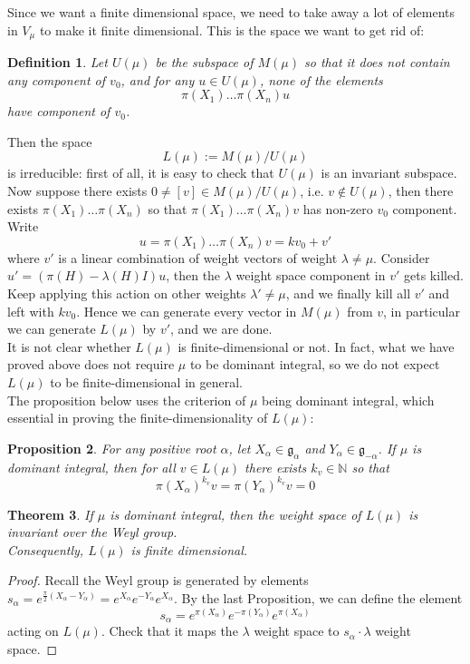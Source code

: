 \documentclass[11pt]{book}
\newtheorem{theorem}{Theorem}[section]
\newtheorem{proposition}[theorem]{Proposition}
\newtheorem{definition}[theorem]{Definition}
\newcommand{\bb}[1]{\mathbb{#1}}
\newcommand{\mf}[1]{\mathfrak{#1}}
\begin{document}
\noindent Since we want a finite dimensional space, we need to take away a lot of elements in $V_{\mu}$ to make it finite dimensional. This is the space we want to get rid of:
\begin{definition}
Let $U(\mu)$ be the subspace of $M(\mu)$ so that it does not contain any component of $v_0$, and for any $u \in U(\mu)$, none of the elements
$$\pi(X_1) \dots \pi(X_n)u$$
have component of $v_0$.
\end{definition}
Then the space
$$L(\mu) := M(\mu)/U(\mu)$$
is irreducible: first of all, it is easy to check that $U(\mu)$ is an invariant subspace. Now suppose there exists $0 \neq [v] \in M(\mu)/U(\mu)$, i.e. $v \notin U(\mu)$, then there exists $\pi(X_1)\dots\pi(X_n)$ so that $\pi(X_1)\dots\pi(X_n)v$ has non-zero $v_0$ component. Write
$$u = \pi(X_1)\dots\pi(X_n)v = kv_0 + v'$$
where $v'$ is a linear combination of weight vectors of weight $\lambda \neq \mu$. Consider $u' = (\pi(H) - \lambda(H)I)u$, then the $\lambda$ weight space component in $v'$ gets killed. Keep applying this action on other weights $\lambda' \neq \mu$, and we finally kill all $v'$ and left with $kv_0$. Hence we can generate every vector in $M(\mu)$ from $v$, in particular we can generate $L(\mu)$ by $v'$, and we are done.\\

It is not clear whether $L(\mu)$ is finite-dimensional or not. In fact, what we have proved above does not require $\mu$ to be dominant integral, so we do not expect $L(\mu)$ to be finite-dimensional in general.\\
The proposition below uses the criterion of $\mu$ being dominant integral, which essential in proving the finite-dimensionality of $L(\mu)$:
\begin{proposition}
For any positive root $\alpha$, let $X_{\alpha} \in \mf{g}_{\alpha}$ and $Y_{\alpha} \in \mf{g}_{-\alpha}$. If $\mu$ is dominant integral, then for all $v \in L(\mu)$ there exists $k_v \in \bb{N}$ so that
$$\pi(X_{\alpha})^{k_v} v = \pi(Y_{\alpha})^{k_v} v = 0$$
\end{proposition}

\begin{theorem}
If $\mu$ is dominant integral, then the weight space of $L(\mu)$ is invariant over the Weyl group.\\
Consequently, $L(\mu)$ is finite dimensional.
\end{theorem}
\begin{proof}
Recall the Weyl group is generated by elements $s_{\alpha} = e^{\frac{\pi}{2}(X_{\alpha} - Y_{\alpha})} = e^{X_{\alpha}}e^{-Y_{\alpha}}e^{X_{\alpha}}$. By the last Proposition, we can define the element
$$s_{\alpha} = e^{\pi(X_{\alpha})}e^{-\pi(Y_{\alpha})}e^{\pi(X_{\alpha})}$$
acting on $L(\mu)$. Check that it maps the $\lambda$ weight space to $s_{\alpha} \cdot \lambda$ weight space.
\end{proof}
\end{document}

